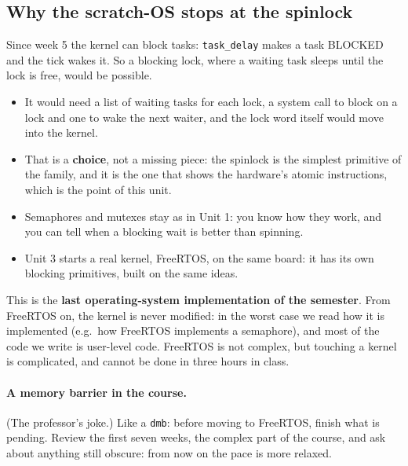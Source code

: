 \subsection{Why the scratch-OS stops at the spinlock}
Since week 5 the kernel can block tasks: \texttt{task\_delay} makes a task BLOCKED and the tick wakes it. So a blocking lock, where a waiting task sleeps until the lock is free, would be possible.
\begin{itemize}
    \item It would need a list of waiting tasks for each lock, a system call to block on a lock and one to wake the next waiter, and the lock word itself would move into the kernel.
    \item That is a \textbf{choice}, not a missing piece: the spinlock is the simplest primitive of the family, and it is the one that shows the hardware's atomic instructions, which is the point of this unit.
    \item Semaphores and mutexes stay as in Unit 1: you know how they work, and you can tell when a blocking wait is better than spinning.
    \item Unit 3 starts a real kernel, FreeRTOS, on the same board: it has its own blocking primitives, built on the same ideas.
\end{itemize}
This is the \textbf{last operating-system implementation of the semester}. From FreeRTOS on, the kernel is never modified: in the worst case we read how it is implemented (e.g.\ how FreeRTOS implements a semaphore), and most of the code we write is user-level code. FreeRTOS is not complex, but touching a kernel is complicated, and cannot be done in three hours in class.

\paragraph{A memory barrier in the course.} (The professor's joke.) Like a \texttt{dmb}: before moving to FreeRTOS, finish what is pending. Review the first seven weeks, the complex part of the course, and ask about anything still obscure: from now on the pace is more relaxed.


